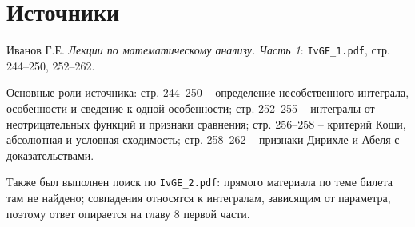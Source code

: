 \documentclass[12pt,a4paper]{article}
\begin{document}
\section*{Источники}

Иванов Г.Е. \emph{Лекции по математическому анализу. Часть 1}:
\texttt{IvGE\_1.pdf}, стр. 244--250, 252--262.

Основные роли источника: стр. 244--250 -- определение несобственного
интеграла, особенности и сведение к одной особенности; стр. 252--255 --
интегралы от неотрицательных функций и признаки сравнения; стр. 256--258 --
критерий Коши, абсолютная и условная сходимость; стр. 258--262 -- признаки
Дирихле и Абеля с доказательствами.

Также был выполнен поиск по \texttt{IvGE\_2.pdf}: прямого материала по теме
билета там не найдено; совпадения относятся к интегралам, зависящим от
параметра, поэтому ответ опирается на главу 8 первой части.
\end{document}
